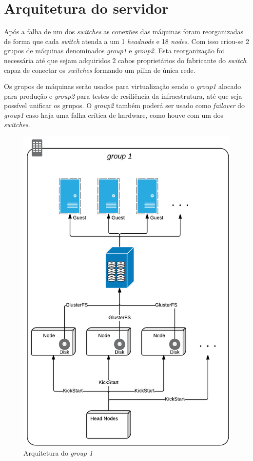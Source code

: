 \section{Arquitetura do servidor}
Após a falha de um dos \textit{switches} as conexões das máquinas foram reorganizadas de forma que cada \textit{switch} atenda a um 1 \textit{headnode} e 18 \textit{nodes}. Com isso criou-se 2 grupos de máquinas denominados \textit{group1} e \textit{group2}. Esta reorganização foi necessária até que sejam adquiridos 2 cabos proprietários do fabricante do \textit{switch} capaz de conectar os \textit{switches} formando um pilha de única rede.

Os grupos de máquinas serão usados para virtualização sendo o \textit{group1} alocado para produção e \textit{group2} para testes de resiliência da infraestrutura, até que seja possível unificar os grupos. O \textit{group2} também poderá ser usado como \textit{failover} do \textit{group1} caso haja uma falha crítica de hardware, como houve com um dos \textit{switches}.

    \begin{figure}[htb]
    \centering
    \includegraphics[scale=0.6]{imagens/group1.pdf}
    \caption{Arquitetura do \textit{group 1}}
    \label{fig:group1}
    \end{figure}

